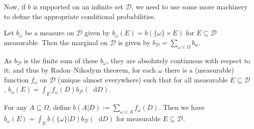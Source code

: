 \documentclass[a4paper]{article}
\newcommand\Exp{\mathsf{Exp}}
\newcommand\U{\mathfrak{U}} %
\newcommand{\D}{\mathcal{D}}
\newcommand{\Decs}{\mathcal{D}}
\newcommand\s{\mathsf{s}}
\newcommand{\n}{\mathsf{n}}
\renewcommand{\Re}{\mathbb{R}}
\renewcommand{\color}[1]{}
\newenvironment{colored}[1]{\leavevmode\color{#1}}{}
\newcommand*\diff{\mathop{}\!\mathrm{d}}
\newenvironment{CCM rewritten}
{\begingroup\color{blue}} %
{\endgroup}              %
\begin{document}
\begin{colored}{violet}
\begin{colored}{red}
%
%
%
%
%
%
Now, if $b$ is supported on an infinite set $\Decs$, we need to use some more machinery to define the appropriate conditional probabilities. 



Let $b_\omega$ be a measure on $\Decs$ given by $b_\omega(E)=b(\{\omega\}\times E)$ for $E\subseteq \Decs$ measurable. 
Then the marginal on $\Decs$ is given by  $b_\D=\sum_{\omega\in\Omega} b_w$. 

As $b_\D$ is the finite sum of these $b_\omega$, they are absolutely continuous with respect to it; and thus by Radon–Nikodym theorem, for each $\omega$ there is a (measurable) function $f_\omega$ on $\Decs$ (unique almost everywhere) such that for all measurable $E\subseteq\Decs$, $b_\omega(E)=\int_{E}f_\omega(D) b_\D(\diff D)$. 


For any $A\subseteq\Omega$, define $b(A | D):= \sum_{\omega\in A}f_\omega(D)$. Then we have $b_\omega(E)=\int_{E}b(\{\omega\} |D) b_\D(\diff D)$ for measurable $E\subseteq \Decs$. 




\end{colored}
\end{colored}
\end{document}
